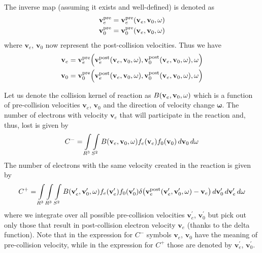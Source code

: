 \documentclass{article}
\newcommand{\myint}{\int\limits}
\newcommand{\diff}[1]{\, d#1}
\newcommand{\vect}[1]{\mathbf{#1}}
\newcommand{\of}[1]{\mleft( #1 \mright)}
\begin{document}
The inverse map (assuming it exists and well-defined) is denoted as 
\begin{align*}
\vect{v}_e^\text{pre} &= \vect{v}_e^\text{pre} \of{\vect{v}_e, \vect{v}_0, \vect{\omega}}
\\
\vect{v}_0^\text{pre} &= \vect{v}_0^\text{pre} \of{\vect{v}_e, \vect{v}_0, \vect{\omega}}
\end{align*} 
where $\vect{v}_e$, $\vect{v}_0$ now represent the post-collision velocities. Thus we have 
\begin{align*}
\vect{v}_e &= \vect{v}_e^\text{pre} \of{\vect{v}_e^\text{post} \of{\vect{v}_e, \vect{v}_0, \vect{\omega}}, \vect{v}_0^\text{post} \of{\vect{v}_e, \vect{v}_0, \vect{\omega}}, \vect{\omega}}
\\
\vect{v}_0 &= \vect{v}_0^\text{pre} \of{\vect{v}_e^\text{post} \of{\vect{v}_e, \vect{v}_0, \vect{\omega}}, \vect{v}_0^\text{post} \of{\vect{v}_e, \vect{v}_0, \vect{\omega}}, \vect{\omega}}
\end{align*} 

Let us denote the collision kernel of reaction as $B\of{\vect{v}_e, \vect{v}_0, \vect{\omega}}$ which is a function of pre-collision velocities $\vect{v}_e$, $\vect{v}_0$ and the direction of velocity change $\vect{\omega}$. The number of electrons with velocity $\vect{v}_e$ that will participate in the reaction and, thus, lost is given by 
\begin{align*}
C^- = \myint_{R^3} \myint_{S^2} B\of{\vect{v}_e, \vect{v}_0, \vect{\omega}} f_e\of{\vect{v}_e} f_0\of{\vect{v}_0} \diff{\vect{v}_0} \diff{\vect{\omega}}
\end{align*}
The number of electrons with the same velocity created in the reaction is given by
\begin{align*}
C^+ = \myint_{R^3} \myint_{R^3} \myint_{S^2} 
B\of{\vect{v}_e^\prime, \vect{v}_0^\prime, \vect{\omega}} 
f_e\of{\vect{v}_e^\prime} f_0\of{\vect{v}_0^\prime} 
\delta\of{\vect{v}_e^\text{post}\of{\vect{v}_e^\prime, \vect{v}_0^\prime, \vect{\omega}} - \vect{v}_e} 
\diff{\vect{v}_0^\prime} \diff{\vect{v}_e^\prime} \diff{\vect{\omega}}
\end{align*}
where we integrate over all possible pre-collision velocities $\vect{v}_e^\prime$, $\vect{v}_0^\prime$ but pick out only those that result in post-collision electron velocity $\vect{v}_e$ (thanks to the delta function). Note that in the expression for $C^-$ symbols $\vect{v}_e$, $\vect{v}_0$ have the meaning of pre-collision velocity, while in the expression for $C^+$ those are denoted by $\vect{v}_e^\prime$, $\vect{v}_0^\prime$. 
\end{document}

